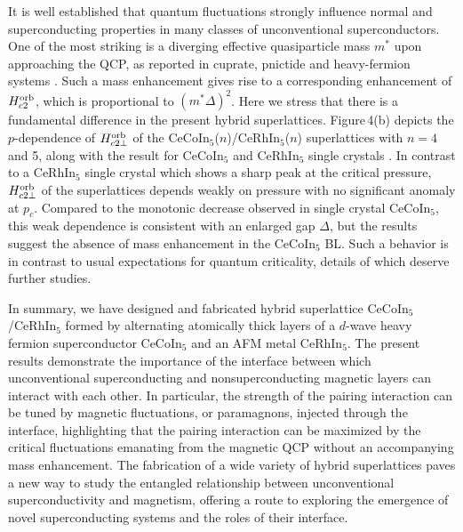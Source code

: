 \documentclass[twocolumn,preprintnumbers,amsmath,amssymb,prl]{revtex4}
\begin{document}
It is well established that quantum fluctuations strongly influence normal and superconducting properties in many classes of unconventional superconductors.   One of the most striking is a diverging effective quasiparticle mass $m^*$ upon approaching the QCP, as reported in cuprate, pnictide and heavy-fermion systems \cite{Shibauchi2014,Shishido2005,Ramshaw}.  Such a mass enhancement gives rise to a corresponding enhancement of $H_{c2}^{\rm orb}$, which is proportional to  $(m^*\Delta)^2$.  Here we stress that there is a fundamental difference in the present hybrid superlattices.  Figure\,4(b) depicts the $p$-dependence of $H_{c2\perp}^{\rm orb}$ of the CeCoIn$_5$($n$)/CeRhIn$_5$($n$) superlattices with $n=4$ and 5, along with the result for CeCoIn$_5$ and CeRhIn$_5$ single crystals \cite{Park2008,Knebel2010}.  In contrast to a CeRhIn$_5$ single crystal which shows a sharp peak at the critical pressure, $H_{c2\perp}^{\rm orb}$ of the superlattices depends weakly on pressure with no significant anomaly at $p_c$. Compared to the monotonic decrease  observed in single crystal CeCoIn$_5$, this weak dependence is consistent with an enlarged gap $\Delta$, but the results suggest the absence of %
mass enhancement in the CeCoIn$_5$ BL. Such a behavior is in contrast to usual expectations for quantum criticality, details of which deserve further studies. 



In summary, we have designed and fabricated hybrid superlattice CeCoIn$_5$/CeRhIn$_5$ formed by alternating atomically thick layers of a $d$-wave heavy fermion superconductor CeCoIn$_5$ and an AFM metal CeRhIn$_5$. 
The present results demonstrate the importance of the interface between which unconventional superconducting and nonsuperconducting magnetic layers can interact with each other.  
In particular, the  strength of the pairing interaction can be tuned by magnetic fluctuations, or paramagnons, injected through the interface, highlighting that the pairing interaction can be maximized by the critical fluctuations emanating from the magnetic QCP without an accompanying mass enhancement.     The fabrication of a wide variety of hybrid superlattices  paves a new way to study the entangled relationship between unconventional superconductivity and magnetism, offering a route to exploring the emergence of novel superconducting systems and the roles of their interface. 
\end{document}
